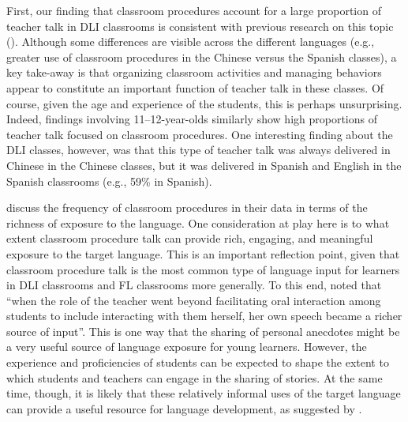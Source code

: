 \documentclass[output=paper,chinesefont]{langscibook}
\begin{document}
First, our finding that classroom procedures account for a large proportion of teacher talk in DLI classrooms is consistent with previous research on this topic (\citealt{CollinsEtAl2012,Huensch2019}). Although some differences are visible across the different languages (e.g., greater use of classroom procedures in the Chinese versus the Spanish classes), a key take-away is that organizing classroom activities and managing behaviors appear to constitute an important function of teacher talk in these classes. Of course, given the age and experience of the students, this is perhaps unsurprising. Indeed,  findings involving 11--12-year-olds similarly show high proportions of teacher talk focused on classroom procedures. One interesting finding about the DLI classes, however, was that this type of teacher talk was always delivered in Chinese in the Chinese classes, but it was delivered in Spanish and English in the Spanish classrooms (e.g., 59\% in Spanish).

\citet{CollinsEtAl2012} discuss the frequency of classroom procedures in their data in terms of the richness of exposure to the language. One consideration at play here is to what extent classroom procedure talk can provide rich, engaging, and meaningful exposure to the target language. This is an important reflection point, given that classroom procedure talk is the most common type of language input for learners in DLI classrooms and FL classrooms more generally. To this end, \citet[81]{CollinsEtAl2012} noted that ``when the role of the teacher went beyond facilitating oral interaction among students to include interacting with them herself, her own speech became a richer source of input''. This is one way that the sharing of personal anecdotes might be a very useful source of language exposure for young learners. However, the experience and proficiencies of students can be expected to shape the extent to which students and teachers can engage in the sharing of stories. At the same time, though, it is likely that these relatively informal uses of the target language can provide a useful resource for language development, as suggested by \citet{Jia2017}.
\end{document}
